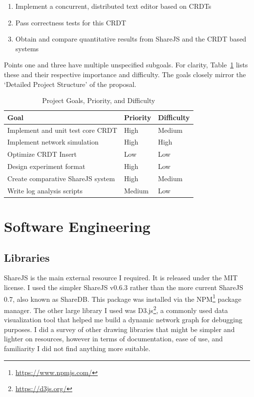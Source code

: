 \documentclass[12pt,a4paper,twoside,openright]{report}
\begin{document}
\begin{enumerate}
\item Implement a concurrent, distributed text editor based on CRDTs 
\item Pass correctness tests for this CRDT
\item Obtain and compare quantitative results from ShareJS and the CRDT based systems
\end{enumerate}

Points one and three have multiple unspecified subgoals. For clarity, Table~\ref{table: goals} lists these and their respective importance and difficulty. The goals closely mirror the `Detailed Project Structure' of the proposal.

\begin{center}
\begin{table}[H]
\centering
\caption{Project Goals, Priority, and Difficulty}
\label{table: goals}
\begin{tabular}{@{}lll@{}}
Goal											 	& Priority & Difficulty \\ \toprule
Implement and unit test core CRDT                	& High     & Medium \\ \midrule
Implement network simulation                     	& High     & High   \\ \midrule
Optimize CRDT Insert                             	& Low      & Low    \\ \midrule
Design experiment format                         	& High     & Low    \\ \midrule
Create comparative ShareJS system					& High     & Medium \\ \midrule
Write log analysis scripts                       	& Medium   & Low    \\ \bottomrule
\end{tabular}
\end{table}
\end{center}



\section{Software Engineering}

	\subsection{Libraries}
	ShareJS \cite{sharejs} is the main external resource I required. It is released under the MIT license. I used the simpler ShareJS v0.6.3 rather than the more current ShareJS 0.7, also known as ShareDB. This package was installed via the NPM\footnote{\url{https://www.npmjs.com/}} package manager. The other large library I used was D3.js\footnote{\url{https://d3js.org/}}, a commonly used data visualization tool that helped me build a dynamic network graph for debugging purposes. I did a survey of other drawing libraries that might be simpler and lighter on resources, however in terms of documentation, ease of use, and familiarity I did not find anything more suitable.
	
\end{document}
